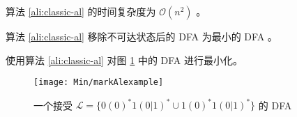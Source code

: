 \begin{theorem}
    算法 \ref{ali:classic-al} 的时间复杂度为 $\mathcal{O}(n^2)$ \cite{yingjie2009describing}。
\end{theorem}

\begin{theorem}
    算法 \ref{ali:classic-al} 移除不可达状态后的 DFA 为最小的 DFA \cite{book1}。
\end{theorem}



\begin{example}
    使用算法 \ref{ali:classic-al} 对图 \ref{fig:DFAMin-3-0-minexample} 中的 DFA 进行最小化。
\end{example}

\begin{figure}[!htbp]
    \centering
    \texttt{[image: Min/markAlexample]}
    \caption{一个接受 $\mathcal{L}=\{ 0(0)^*1(0|1)^* \cup 1(0)^*1(0|1)^*  \}$ 的 DFA }
    \label{fig:DFAMin-3-0-minexample}
\end{figure}


